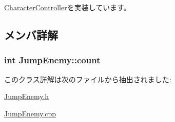 \hyperlink{class_character_controller_a493d5b59610546133900f4de7110a487}{Character\+Controller}を実装しています。



\subsection{メンバ詳解}
\hypertarget{class_jump_enemy_acdb8b9943cefb60493cc8ed9b47d6304}{
\subsubsection[{count}]{\setlength{\rightskip}{0pt plus 5cm}int Jump\+Enemy\+::count\hspace{0.3cm}{\ttfamily [private]}}}\label{class_jump_enemy_acdb8b9943cefb60493cc8ed9b47d6304}


このクラス詳解は次のファイルから抽出されました\+:\begin{DoxyCompactItemize}
\item 
\hyperlink{_jump_enemy_8h}{Jump\+Enemy.\+h}\item 
\hyperlink{_jump_enemy_8cpp}{Jump\+Enemy.\+cpp}\end{DoxyCompactItemize}
